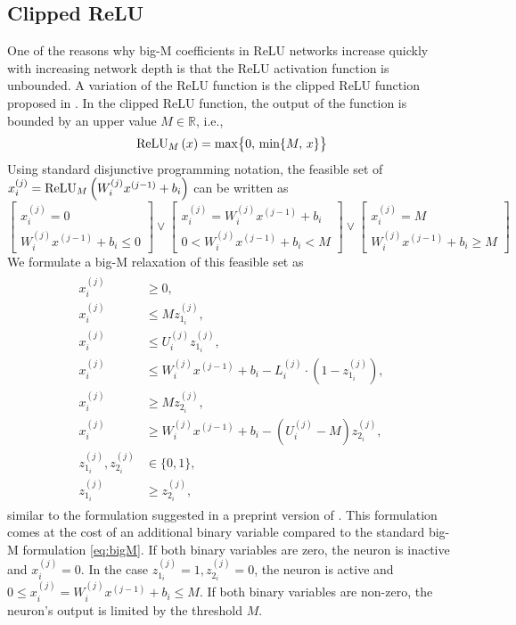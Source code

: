 \subsection{Clipped ReLU} \label{sec:clipped}
%
One of the reasons why big-M coefficients in ReLU networks increase quickly with increasing network depth is that the ReLU activation function is unbounded. A variation of the ReLU function is the clipped ReLU function proposed in \citet{Hannun2014}. In the clipped ReLU function, the output of the function is bounded by an upper value $M \in \mathbb{R}$, i.e.,
\begin{align}\label{eq:relu_m}
    \myClippedReLU[M]{x} = \max\bigl\{0,\, \min\{M,\, x\}\bigr\}
\end{align}
%
Using standard disjunctive programming notation, the feasible set of $x_i^{(j)} = \myClippedReLU[M]{ W^{(j)}_i x^{(j-1)} + b_i}$ can be written as
%
\[
\begin{bmatrix}
    x_i^{(j)} = 0 \\
    W^{(j)}_i x^{(j-1)} + b_i \leq 0
\end{bmatrix}
\vee 
\begin{bmatrix}
    x_i^{(j)} = W^{(j)}_i x^{(j-1)} + b_i\\
    0 < W^{(j)}_i x^{(j-1)} + b_i < M 
\end{bmatrix}
\vee
\begin{bmatrix}
    x_i^{(j)} = M \\
    W^{(j)}_i x^{(j-1)} + b_i \geq M 
\end{bmatrix}
\]
%
We formulate a big-M relaxation of this feasible set as
\begin{align}
    \begin{split}
        x_i^{(j)} & \geq 0, \\
        x_i^{(j)} & \leq M z_{1_i}^{(j)}, \\
        x_i^{(j)} & \leq U_i^{(j)} z_{1_i}^{(j)}, \\
        x_i^{(j)} & \leq W^{(j)}_i x^{(j-1)} + b_i - L_i^{(j)} \cdot (1-z_{1_i}^{(j)}),\\
        x_i^{(j)} & \geq M z_{2_i}^{(j)}, \\
        x_i^{(j)} & \geq W^{(j)}_i x^{(j-1)} + b_i - (U_i^{(j)}-M) z_{2_i}^{(j)}, \\
        z_{1_i}^{(j)}, z_{2_i}^{(j)} & \in \{0,1\},\\
        z_{1_i}^{(j)} & \geq z_{2_i}^{(j)},
    \end{split}
    \label{eq:bigM_clipped}
\end{align}
similar to the formulation suggested in a preprint version of \citet{Anderson2020}.
This formulation comes at the cost of an additional binary variable compared to the standard big-M formulation \eqref{eq:bigM}. If both binary variables are zero, the neuron is inactive and $x_i^{(j)}=0$. In the case $z_{1_i}^{(j)}=1, z_{2_i}^{(j)}=0$, the neuron is active and $0 \leq x_i^{(j)} =  W^{(j)}_i x^{(j-1)} + b_i \leq M$. If both binary variables are non-zero, the neuron's output is limited by the threshold $M$. 

